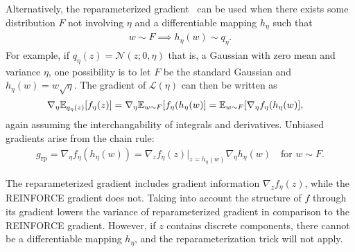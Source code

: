 Alternatively, the reparameterized gradient~\citep{rezende2014stochastic, kingma2013autoencoding} can be used when there exists some distribution $F$ not involving $\eta$ and a differentiable mapping $h_\eta$ such that
\begin{align}
    w \sim F \implies h_\eta(w) \sim q_\eta.
\end{align}
For example, if $q_{\eta}(z) = \mathcal{N}(z; 0, \eta)$ that is, a Gaussian with zero mean and variance $\eta$, one possibility is to let $F$ be the standard Gaussian and $h_\eta(w) = w \sqrt{\eta}$.
The gradient of $\mathcal{L}(\eta)$ can then be written as
\begin{align}
    \nabla_\eta \mathbb{E}_{q_\eta(z)}[f_\eta(z)] &=
        \nabla_\eta \mathbb{E}_{w\sim F}[f_\eta(h_\eta(w)] = \mathbb{E}_{w\sim F}[\nabla_\eta f_\eta(h_\eta(w)],
\end{align}
again assuming the interchangability of integrals and derivatives.
Unbiased gradients arise from the chain rule: 
\begin{align}
    g_{\textrm{rp}}
    = \nabla_\eta f_\eta(h_\eta(w))
    = \nabla_z f_\eta(z)\Big|_{z = h_\eta(w)}
    \nabla_\eta h_\eta(w) \quad \text{for } w\sim F.
\end{align}

The reparameterized gradient includes gradient information $\nabla_z f_\eta(z)$, while the REINFORCE gradient does not. Taking into account the structure of $f$ through its gradient lowers the variance of reparameterized gradient in comparison to the REINFORCE gradient.
However, if $z$ contains discrete components, there cannot be a differentiable mapping $h_\eta$, and the reparameterization trick will not apply.

